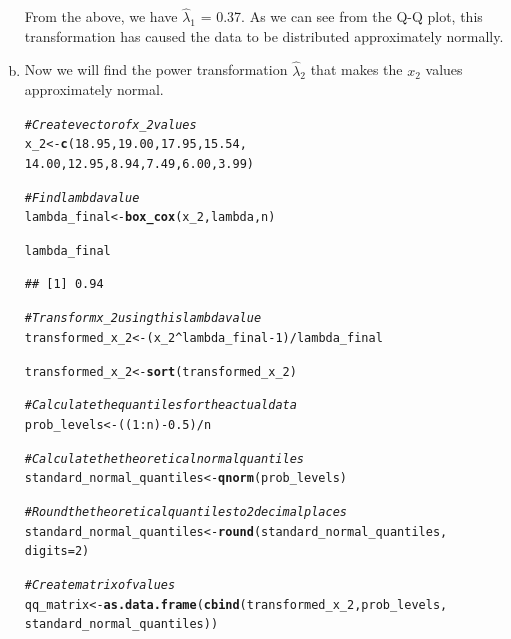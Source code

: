 \documentclass[12pt]{article}\usepackage[]{graphicx}\usepackage[]{color}
\makeatletter
\newcommand{\hlnum}[1]{\textcolor[rgb]{0.686,0.059,0.569}{#1}}%
\newcommand{\hlcom}[1]{\textcolor[rgb]{0.678,0.584,0.686}{\textit{#1}}}%
\newcommand{\hlopt}[1]{\textcolor[rgb]{0,0,0}{#1}}%
\newcommand{\hlstd}[1]{\textcolor[rgb]{0.345,0.345,0.345}{#1}}%
\newcommand{\hlkwb}[1]{\textcolor[rgb]{0.69,0.353,0.396}{#1}}%
\newcommand{\hlkwc}[1]{\textcolor[rgb]{0.333,0.667,0.333}{#1}}%
\newcommand{\hlkwd}[1]{\textcolor[rgb]{0.737,0.353,0.396}{\textbf{#1}}}%
\newenvironment{kframe}{%
 \def\at@end@of@kframe{}%
 \ifinner\ifhmode%
  \def\at@end@of@kframe{\end{minipage}}%
  \begin{minipage}{\columnwidth}%
 \fi\fi%
 \def\FrameCommand##1{\hskip\@totalleftmargin \hskip-\fboxsep
 \colorbox{shadecolor}{##1}\hskip-\fboxsep
     \hskip-\linewidth \hskip-\@totalleftmargin \hskip\columnwidth}%
 \MakeFramed {\advance\hsize-\width
   \@totalleftmargin\z@ \linewidth\hsize
   \@setminipage}}%
 {\par\unskip\endMakeFramed%
 \at@end@of@kframe}
\newenvironment{knitrout}{}{} %
\makeatother
\begin{document}
\begin{enumerate}[a)]
\begin{knitrout}
\end{knitrout}

From the above, we have $\hat{\lambda}_1$ = 0.37. As we can see from the Q-Q plot, this transformation has caused the data to be distributed approximately normally. 

\item Now we will find the power transformation $\hat{\lambda}_2$ that makes the $x_2$ values approximately normal.

\begin{knitrout}
\color{fgcolor}\begin{kframe}
\begin{alltt}
\hlcom{#Create vector of x_2 values}
\hlstd{x_2} \hlkwb{<-} \hlkwd{c}\hlstd{(}\hlnum{18.95}\hlstd{,} \hlnum{19.00}\hlstd{,} \hlnum{17.95}\hlstd{,} \hlnum{15.54}\hlstd{,}
         \hlnum{14.00}\hlstd{,} \hlnum{12.95}\hlstd{,} \hlnum{8.94}\hlstd{,} \hlnum{7.49}\hlstd{,} \hlnum{6.00}\hlstd{,} \hlnum{3.99}\hlstd{)}

\hlcom{#Find lambda value}
\hlstd{lambda_final} \hlkwb{<-} \hlkwd{box_cox}\hlstd{(x_2, lambda, n)}

\hlstd{lambda_final}
\end{alltt}
\begin{verbatim}
## [1] 0.94
\end{verbatim}
\begin{alltt}
\hlcom{#Transform x_2 using this lambda value}
\hlstd{transformed_x_2} \hlkwb{<-} \hlstd{(x_2}\hlopt{^}\hlstd{lambda_final} \hlopt{-} \hlnum{1}\hlstd{)}\hlopt{/}\hlstd{lambda_final}

\hlstd{transformed_x_2} \hlkwb{<-} \hlkwd{sort}\hlstd{(transformed_x_2)}

\hlcom{#Calculate the quantiles for the actual data}
\hlstd{prob_levels} \hlkwb{<-} \hlstd{((}\hlnum{1}\hlopt{:}\hlstd{n)}\hlopt{-}\hlnum{0.5}\hlstd{)}\hlopt{/}\hlstd{n}

\hlcom{#Calculate the theoretical normal quantiles}
\hlstd{standard_normal_quantiles} \hlkwb{<-} \hlkwd{qnorm}\hlstd{(prob_levels)}

\hlcom{#Round the theoretical quantiles to 2 decimal places}
\hlstd{standard_normal_quantiles} \hlkwb{<-} \hlkwd{round}\hlstd{(standard_normal_quantiles,}
                                   \hlkwc{digits} \hlstd{=} \hlnum{2}\hlstd{)}

\hlcom{#Create matrix of values}
\hlstd{qq_matrix} \hlkwb{<-} \hlkwd{as.data.frame}\hlstd{(}\hlkwd{cbind}\hlstd{(transformed_x_2, prob_levels,}
                                 \hlstd{standard_normal_quantiles))}


\end{alltt}
\end{kframe}
\end{knitrout}
\end{enumerate}
\end{document}
